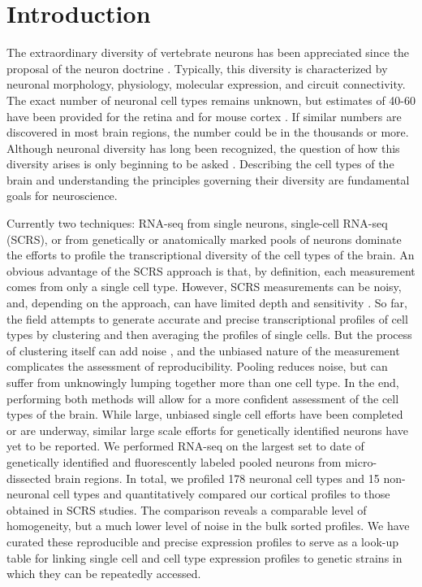 \section*{Introduction}

The extraordinary diversity of vertebrate neurons has been appreciated since the proposal of the neuron doctrine \citep{0195074017}. Typically, this diversity is characterized by neuronal morphology, physiology, molecular expression, and circuit connectivity. The exact number of neuronal cell types remains unknown, but estimates of 40-60 have been provided for the retina \citep{Macosko_2015,Masland_2004} and for mouse cortex \citep{Tasic_2016,Zeisel_2015}. If similar numbers are discovered in most brain regions, the number could be in the thousands or more. Although neuronal diversity has long been recognized, the question of how this diversity arises is only beginning to be asked \citep{Arendt_2008,Muotri_2006}. Describing the cell types of the brain and understanding the principles governing their diversity are fundamental goals for neuroscience.

Currently two techniques: RNA-seq from single neurons, single-cell RNA-seq (SCRS), \citep[e.g.][]{Shapiro_2013} or from genetically or anatomically marked pools of neurons \citep[e.g.][]{Okaty_2015,Cembrowski_2016} dominate the efforts to profile the transcriptional diversity of the cell types of the brain. An obvious advantage of the SCRS approach is that, by definition, each measurement comes from only a single cell type. However, SCRS measurements can be noisy, and, depending on the approach, can have limited depth and sensitivity \citep{Parekh_2016,Svensson_2017}. So far, the field attempts to generate accurate and precise transcriptional profiles of cell types by clustering and then averaging the profiles of single cells. But the process of clustering itself can add noise \citep{Ntranos_2016}, and the unbiased nature of the measurement complicates the assessment of reproducibility. Pooling reduces noise, but can suffer from unknowingly lumping together more than one cell type. In the end, performing both methods will allow for a more confident assessment of the cell types of the brain. While large, unbiased single cell efforts have been completed or are underway, similar large scale efforts for genetically identified neurons have yet to be reported. We performed RNA-seq on the largest set to date of genetically identified and fluorescently labeled pooled neurons from micro-dissected brain regions. In total, we profiled 178 neuronal cell types and 15 non-neuronal cell types and quantitatively compared our cortical profiles to those obtained in SCRS studies. The comparison reveals a comparable level of homogeneity, but a much lower level of noise in the bulk sorted profiles. We have curated these reproducible and precise expression profiles to serve as a look-up table for linking single cell and cell type expression profiles to genetic strains in which they can be repeatedly accessed. 

